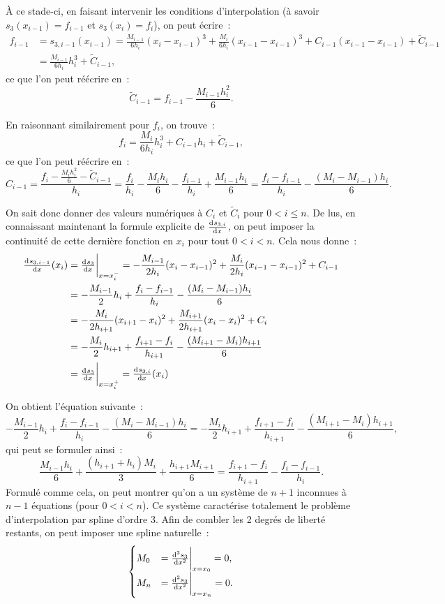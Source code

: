 \documentclass{article}
\theoremstyle{definition}
\theoremstyle{remark}
\begin{document}
		À ce stade-ci, en faisant intervenir les conditions d'interpolation (à savoir $s_3(x_{i-1}) = f_{i-1}$ et $s_3(x_i) = f_i$), on peut écrire~:
		\begin{align*}
			f_{i-1} &= s_{3, i-1}(x_{i-1}) = \frac {M_{i-1}}{6h_i}(x_i-x_{i-1})^3 + \frac {M_i}{6h_i}(x_{i-1}-x_{i-1})^3 + C_{i-1}(x_{i-1}-x_{i-1}) + \widetilde C_{i-1} \\
			&= \frac {M_{i-1}}{6h_i}h_i^3 + \widetilde C_{i-1},
		\end{align*}
		ce que l'on peut réécrire en~:
		\[\widetilde C_{i-1} = f_{i-1} - \frac {M_{i-1}h_i^2}6.\]

		En raisonnant similairement pour $f_i$, on trouve~:
		\[f_i = \frac {M_i}{6h_i}h_i^3 + C_{i-1}h_i + \widetilde C_{i-1},\]
		ce que l'on peut réécrire en~:
		\[C_{i-1} = \frac {f_i - \frac {M_ih_i^2}6 - \widetilde C_{i-1}}{h_i} = \frac {f_i}{h_i} - \frac {M_ih_i}6 - \frac {f_{i-1}}{h_i} + \frac {M_{i-1}h_i}6
			= \frac {f_i-f_{i-1}}{h_i} - \frac {(M_i-M_{i-1})h_i}6.\]

		On sait donc donner des valeurs numériques à $C_i$ et $\widetilde C_i$ pour $0 < i \leq n$. De lus, en connaissant maintenant la formule explicite de
		$\od {s_{3, i}}x$, on peut imposer la continuité de cette dernière fonction en $x_i$ pour tout $0 < i < n$. Cela nous donne~:
		\begin{align*}
			\od {s_{3, i-1}}x(x_i) &= \od {s_3}x\bigg\rvert_{x=x_i^-} =
				-\frac {M_{i-1}}{2h_i}(x_i-x_{i-1})^2 + \frac {M_i}{2h_i}(x_{i-1}-x_{i-1})^2 + C_{i-1} \\
			&= -\frac {M_{i-1}}2h_i + \frac {f_i - f_{i-1}}{h_i} - \frac {(M_i - M_{i-1})h_i}6 \\
			&= -\frac {M_i}{2h_{i+1}}(x_{i+1}-x_i)^2 + \frac {M_{i+1}}{2h_{i+1}}(x_i-x_i)^2 + C_i \\
			&= -\frac {M_i}2h_{i+1} + \frac {f_{i+1}-f_i}{h_{i+1}} - \frac {(M_{i+1}-M_i)h_{i+1}}6 \\
			&= \od {s_3}x\bigg\rvert_{x=x_i^+} = \od {s_{3, i}}x(x_i)
		\end{align*}
		
		On obtient l'équation suivante~:
		\[-\frac {M_{i-1}}2h_i + \frac {f_i - f_{i-1}}{h_i} - \frac {(M_i - M_{i-1})h_i}6
			= -\frac {M_i}2h_{i+1} + \frac {f_{i+1}-f_i}{h_{i+1}} - \frac {(M_{i+1}-M_i)h_{i+1}}6,\]
		qui peut se formuler ainsi~:
		\[\frac {M_{i-1}h_i}6 + \frac {(h_{i+1}+h_i)M_i}3 + \frac {h_{i+1}M_{i+1}}6
			= \frac {f_{i+1}-f_i}{h_{i+1}} - \frac {f_i - f_{i-1}}{h_i}.\]
		Formulé comme cela, on peut montrer qu'on a un système de $n+1$ inconnues à $n-1$ équations (pour $0 < i < n$).
		Ce système caractérise totalement le problème d'interpolation par spline d'ordre 3. Afin de combler les 2 degrés de liberté restants, on peut imposer
		une spline naturelle~:
		\[\begin{cases}
			M_0 &= \od[2] {s_3}x\bigg\rvert_{x=x_0} = 0, \\
			M_n &= \od[2] {s_3}x\bigg\rvert_{x=x_n} = 0.
		\end{cases}\]
\end{document}
